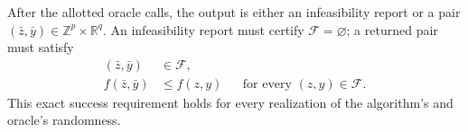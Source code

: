 \documentclass[10pt]{article}
\theoremstyle{definition}
\begin{document}
After the allotted oracle calls, the output is either an infeasibility report or a pair $(\bar{z},\bar{y})\in\mathbb{Z}^p\times\mathbb{R}^q$. An infeasibility report must certify $\mathcal{F}=\varnothing$; a returned pair must satisfy
\[
\begin{aligned}
(\bar{z},\bar{y})&\in\mathcal{F},\\
f(\bar{z},\bar{y})&\leq f(z,y)
&&\text{for every }(z,y)\in\mathcal{F}.
\end{aligned}
\]
This exact success requirement holds for every realization of the algorithm's and oracle's randomness.
\end{document}

